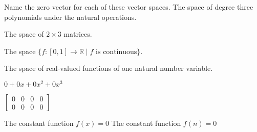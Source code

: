 

\begin{Exercise}[
name={},
title={}, 
difficulty=0,
origin={by Jim Hefferon \cite{JH}}]
Name the zero vector for each of these vector spaces.
\Question
The space of degree three polynomials under the natural operations.

\Question
The space of \( 2\times3 \) matrices.

\Question
The space \( \{f:[0,1]\to\mathbb{R}\;|\; f\text{ is continuous}\} \).

\Question
The space of real-valued functions of one natural number variable.

\end{Exercise}

\begin{Answer}
\Question \( 0+0x+0x^2+0x^3 \)

\Question \( \begin{bmatrix}
                   0  &0  &0  &0  \\
                   0  &0  &0  &0
                 \end{bmatrix} \)

\Question The constant function \( f(x)=0 \)
\Question The constant function \( f(n)=0 \)
\end{Answer}
